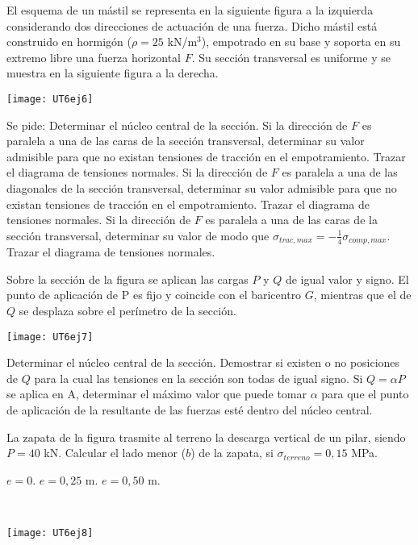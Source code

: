 \ejercicio 

El esquema de un mástil se representa en la siguiente figura a la izquierda considerando dos direcciones de actuación de una fuerza. Dicho mástil está construido en hormigón ($\rho=25 $ kN/m$^3$), empotrado en su base y soporta en su extremo libre una fuerza horizontal $F$. Su sección transversal es uniforme y se muestra en la siguiente figura a la derecha.

\begin{center}
\texttt{[image: UT6ej6]}
\end{center}

Se pide:
\parte Determinar el núcleo central de la sección.
\parte Si la dirección de $F$ es paralela a una de las caras de la sección transversal, determinar su valor admisible para que no existan tensiones de tracción en el empotramiento. Trazar el diagrama de tensiones normales.
\parte Si la dirección de $F$ es paralela a una de las diagonales de la sección transversal, determinar su valor admisible para que no existan tensiones de tracción en el empotramiento. Trazar el diagrama de tensiones normales.
\parte Si la dirección de $F$ es paralela a una de las caras de la sección transversal, determinar su valor de modo que $\sigma_{trac,max}=-\frac{1}{4} \sigma_{comp,max}$. Trazar el diagrama de tensiones normales.

\ejercicio 

Sobre la sección de la figura se aplican las cargas $P$ y $Q$ de igual valor y signo. El punto de aplicación de P es fijo y coincide con el baricentro $G$, mientras que el de $Q$ se desplaza sobre el perímetro de la sección.

\begin{center}
\texttt{[image: UT6ej7]}
\end{center}

\parte Determinar el núcleo central de la sección.
\parte Demostrar si existen o no posiciones de $Q$ para la cual las tensiones en la sección son todas de igual signo.
\parte Si $Q = \alpha P$ se aplica en A, determinar el máximo valor que puede tomar $\alpha$ para que el punto de aplicación de la resultante de las fuerzas esté dentro del núcleo central.

\ejercicio 

\noindent
\begin{minipage}[b]{0.54\textwidth}
La zapata de la figura trasmite al terreno la descarga vertical de un pilar, siendo $P=40$ kN. %
%
Calcular el lado menor ($b$) de la zapata, si $\sigma_{terreno}=0,15$ MPa.

\parte $e=0$.
\parte $e=0,25$ m.
\parte $e=0,50$ m.
\end{minipage}
~
\begin{minipage}[b]{0.45\textwidth}
 \begin{center}
  \texttt{[image: UT6ej8]}
 \end{center}
\end{minipage}


